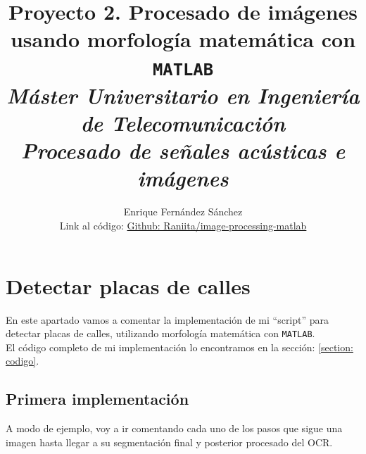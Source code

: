 \documentclass[12pt]{article}
\begin{document}
	
	\title{Proyecto 2. Procesado de imágenes usando morfología matemática con \texttt{MATLAB} \\ \textit{\textbf{\large Máster Universitario en Ingeniería de Telecomunicación}} \\ \textit{\large Procesado de señales acústicas e imágenes}}
	\author{Enrique Fernández Sánchez \\ Link al código: \href{https://github.com/Raniita/image-processing-matlab/tree/main/morfologia}{Github: Raniita/image-processing-matlab}}
	
	\maketitle
	
	\vspace{120px}
	
	\tableofcontents
	
	\pagebreak
	
	\lstlistoflistings
	
	\listoffigures
	
	\pagebreak
	
	\section{Detectar placas de calles}
	
	\noindent En este apartado vamos a comentar la implementación de mi ``script'' para detectar placas de calles, utilizando morfología matemática con \texttt{MATLAB}. \\
	
	\noindent El código completo de mi implementación lo encontramos en la sección: \ref{section: codigo}.
	
	\subsection{Primera implementación}
	\noindent A modo de ejemplo, voy a ir comentando cada uno de los pasos que sigue una imagen hasta llegar a su segmentación final y posterior procesado del OCR.
	
\end{document}
